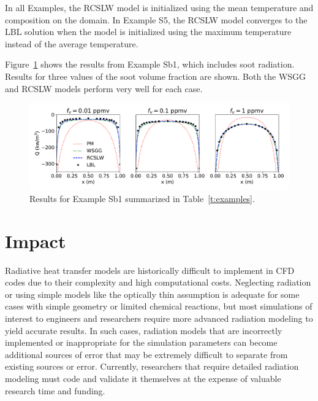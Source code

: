 \documentclass[preprint,12pt, a4paper]{elsarticle}
\begin{document}
In all Examples, the RCSLW model is initialized using the mean temperature and composition on the domain. In Example S5, the RCSLW model converges to the LBL solution when the model is initialized using the maximum temperature instead of the average temperature.

Figure~\ref{f:exSb1} shows the results from Example Sb1, which includes soot radiation. Results for three values of the soot volume fraction are shown. Both the WSGG and RCSLW models perform very well for each case. 
%
\begin{figure}
    \begin{center}
        \includegraphics[width=5.5 in]{ex_Sb1.pdf}
    \caption{Results for Example Sb1 summarized in Table~\ref{t:examples}.}
    \label{f:exSb1}
    \end{center}
\end{figure}
%




\section{Impact} \label{s:impact}

Radiative heat transfer models are historically difficult to implement in CFD codes due to their complexity and high computational costs. Neglecting radiation or using simple models like the optically thin assumption is adequate for some cases with simple geometry or limited chemical reactions, but most simulations of interest to engineers and researchers require more advanced radiation modeling to yield accurate results. In such cases, radiation models that are incorrectly implemented or inappropriate for the simulation parameters can become additional sources of error that may be extremely difficult to separate from existing sources or error. Currently, researchers that require detailed radiation modeling must code and validate it themselves at the expense of valuable research time and funding. 
\end{document}
